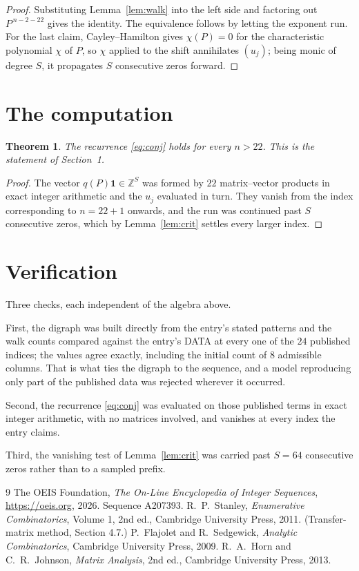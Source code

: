 \documentclass[11pt,a4paper]{article}
\theoremstyle{plain}
\newtheorem{theorem}{Theorem}
\theoremstyle{definition}
\begin{document}
\begin{proof}
Substituting Lemma~\ref{lem:walk} into the left side and factoring out
$P^{\,n-2-22}$ gives the identity. The equivalence follows by letting the exponent
run. For the last claim, Cayley--Hamilton gives $\chi(P)=0$ for the characteristic
polynomial $\chi$ of $P$, so $\chi$ applied to the shift annihilates $(u_j)$; being monic of
degree $S$, it propagates $S$ consecutive zeros forward.
\end{proof}

\section{The computation}

\begin{theorem}
The recurrence \eqref{eq:conj} holds for every $n>22$. This is the statement of
Section~1.
\end{theorem}

\begin{proof}
The vector $q(P)\mathbf{1}\in\mathbb{Z}^{S}$ was formed by $22$ matrix--vector
products in exact integer arithmetic and the $u_j$ evaluated in turn. They vanish from the
index corresponding to $n=22+1$ onwards, and the run was continued past $S$ consecutive
zeros, which by Lemma~\ref{lem:crit} settles every larger index.
\end{proof}

\section{Verification}

Three checks, each independent of the algebra above.

First, the digraph was built directly from the entry's stated patterns and the walk counts
compared against the entry's DATA at every one of the $24$ published indices; the
values agree exactly, including the initial count of $8$ admissible columns. That is
what ties the digraph to the sequence, and a model reproducing only part of the published
data was rejected wherever it occurred.

Second, the recurrence \eqref{eq:conj} was evaluated on those published terms in exact
integer arithmetic, with no matrices involved, and vanishes at every index the entry claims.

Third, the vanishing test of Lemma~\ref{lem:crit} was carried past $S=64$ consecutive
zeros rather than to a sampled prefix.

\begin{thebibliography}{9}
 The OEIS Foundation, \emph{The On-Line Encyclopedia of Integer
Sequences}, \url{https://oeis.org}, 2026. Sequence A207393.
 R.~P.~Stanley, \emph{Enumerative Combinatorics}, Volume 1, 2nd ed.,
Cambridge University Press, 2011. (Transfer-matrix method, Section 4.7.)
 P.~Flajolet and R.~Sedgewick, \emph{Analytic Combinatorics}, Cambridge
University Press, 2009.
 R.~A.~Horn and C.~R.~Johnson, \emph{Matrix Analysis}, 2nd ed., Cambridge
University Press, 2013.
\end{thebibliography}
\end{document}
